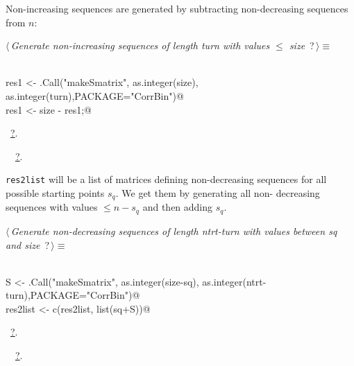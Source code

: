 \documentclass[reqno]{amsart}
\renewcommand{\NWtarget}[2]{\hypertarget{#1}{#2}}
\renewcommand{\NWlink}[2]{\hyperlink{#1}{#2}}
\begin{document}
Non-increasing sequences are generated by subtracting non-decreasing sequences
from  $n$:
\begin{flushleft} \small
\begin{minipage}{\linewidth}\label{scrap17}\raggedright\small
\NWtarget{nuweb?}{} $\langle\,${\itshape Generate non-increasing sequences of length turn with values $\leq$ size}\nobreak\ {\footnotesize {?}}$\,\rangle\equiv$
\vspace{-1ex}
\begin{list}{}{} \item
\mbox{}\verb@@\\
\mbox{}\verb@  res1 <- .Call("makeSmatrix", as.integer(size), as.integer(turn),PACKAGE="CorrBin")@\\
\mbox{}\verb@  res1 <- size - res1;@\\
\mbox{}\verb@@{\NWsep}
\end{list}
\vspace{-1.5ex}
\footnotesize
\begin{list}{}{\setlength{\itemsep}{-\parsep}\setlength{\itemindent}{-\leftmargin}}
\item \NWtxtMacroRefIn\ \NWlink{nuweb?}{?}.
\item \NWtxtIdentsUsed\nobreak\  \verb@makeSmatrix@\nobreak\ \NWlink{nuweb?}{?}.
\item{}
\end{list}
\end{minipage}\vspace{4ex}
\end{flushleft}
\texttt{res2list} will be a list of matrices defining non-decreasing sequences
for all possible starting points $s_q$. We get them by generating all non-
decreasing sequences with values $\leq n-s_q$ and then adding $s_q$. 
\begin{flushleft} \small
\begin{minipage}{\linewidth}\label{scrap18}\raggedright\small
\NWtarget{nuweb?}{} $\langle\,${\itshape Generate non-decreasing sequences of length ntrt-turn with values between sq and size}\nobreak\ {\footnotesize {?}}$\,\rangle\equiv$
\vspace{-1ex}
\begin{list}{}{} \item
\mbox{}\verb@@\\
\mbox{}\verb@  S <- .Call("makeSmatrix", as.integer(size-sq), as.integer(ntrt-turn),PACKAGE="CorrBin")@\\
\mbox{}\verb@  res2list <- c(res2list, list(sq+S))@\\
\mbox{}\verb@@{\NWsep}
\end{list}
\vspace{-1.5ex}
\footnotesize
\begin{list}{}{\setlength{\itemsep}{-\parsep}\setlength{\itemindent}{-\leftmargin}}
\item \NWtxtMacroRefIn\ \NWlink{nuweb?}{?}.
\item \NWtxtIdentsUsed\nobreak\  \verb@makeSmatrix@\nobreak\ \NWlink{nuweb?}{?}.
\item{}
\end{list}
\end{minipage}\vspace{4ex}
\end{flushleft}
\end{document}

